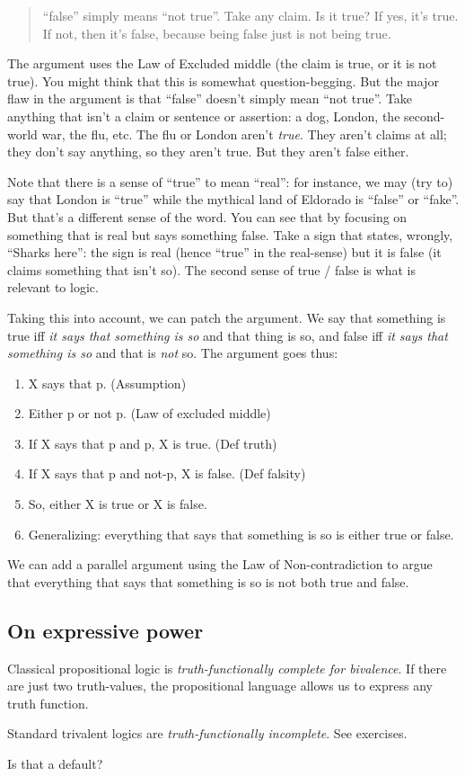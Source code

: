 \documentclass[../../../include/open-logic-section]{subfiles}
\begin{document}
\begin{quote} ``false'' simply means ``not true''. Take any claim. Is it true? If yes, it's true. If not, then it's false, because being false just is not being true.	
\end{quote} 

The argument uses the Law of Excluded middle (the claim is true, or it is not true). You might think that this is somewhat question-begging. But the major flaw in the argument is that ``false'' doesn't simply mean ``not true''. Take anything that isn't a claim or sentence or assertion: a dog, London, the second-world war, the flu, etc. The flu or London aren't \emph{true}. They aren't claims at all; they don't say anything, so they aren't true. But they aren't false either. 

Note that there is a sense of ``true'' to mean ``real'': for instance, we may (try to) say that London is ``true'' while the mythical land of Eldorado is ``false'' or ``fake''. But that's a different sense of the word. You can see that by focusing on something that is real but says something false. Take a sign that states, wrongly, ``Sharks here'': the sign is real (hence ``true'' in the real-sense) but it is false (it claims something that isn't so). The second sense of true / false is what is relevant to logic.

Taking this into account, we can patch the argument. We say that something is true iff \emph{it says that something is so} and that thing is so, and false iff \emph{it says that something is so} and that is \emph{not} so. The argument goes thus:

\begin{enumerate}
	\item X says that p. (Assumption)
	\item Either p or not p. (Law of excluded middle)
	\item If X says that p and p, X is true. (Def truth)
	\item If X says that p and not-p, X is false. (Def falsity)
	\item So, either X is true or X is false.
	\item Generalizing: everything that says that something is so is either true or false.
\end{enumerate}

We can add a parallel argument using the Law of Non-contradiction to argue that everything that says that something is so is not both true and false.

\subsection{On expressive power}

Classical propositional logic is \emph{truth-functionally complete for bivalence}. If there are just two truth-values, the propositional language allows us to express any truth function. 

Standard trivalent logics are \emph{truth-functionally incomplete}. See exercises. 

Is that a default? 
\end{document}
